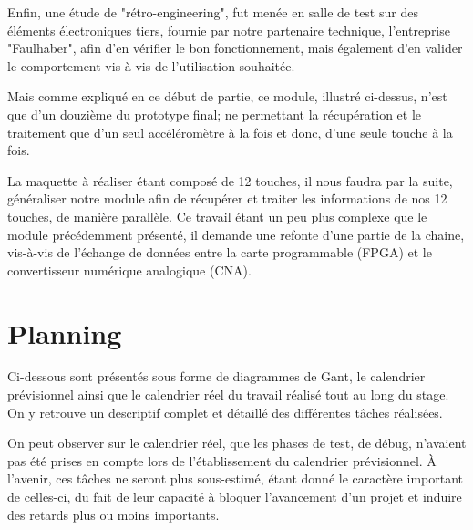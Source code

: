 \documentclass[french,a4paper,12pt]{report}
\begin{document}
	Enfin, une étude de "rétro-engineering", fut menée en salle de test sur des éléments électroniques tiers, fournie par notre partenaire technique, l'entreprise "Faulhaber", afin d'en vérifier le bon fonctionnement, mais également d'en valider le comportement vis-à-vis de l'utilisation souhaitée.
	
	Mais comme expliqué en ce début de partie, ce module, illustré ci-dessus, n'est que d'un douzième du prototype final; ne permettant la récupération et le traitement que d'un seul accéléromètre à la fois et donc, d'une seule touche à la fois.
	
	La maquette à réaliser étant composé de 12 touches, il nous faudra par la suite, généraliser notre module afin de récupérer et traiter les informations de nos 12 touches, de manière parallèle.
	Ce travail étant un peu plus complexe que le module précédemment présenté, il demande une refonte d'une partie de la chaine, vis-à-vis de l'échange de données entre la carte programmable (FPGA) et le convertisseur numérique analogique (CNA).
	
	\chapter{Planning}

	Ci-dessous sont présentés sous forme de diagrammes de Gant, le calendrier prévisionnel ainsi que le calendrier réel du travail réalisé tout au long du stage.
	On y retrouve un descriptif complet et détaillé des différentes tâches réalisées.
	
	On peut observer sur le calendrier réel, que les phases de test, de débug, n'avaient pas été prises en compte lors de l'établissement du calendrier prévisionnel.
	À l'avenir, ces tâches ne seront plus sous-estimé, étant donné le caractère important de celles-ci, du fait de leur capacité à bloquer l'avancement d'un projet et induire des retards plus ou moins importants.
	
	
	
	
	
		
	
	
	
	
%
%
	
\end{document}
